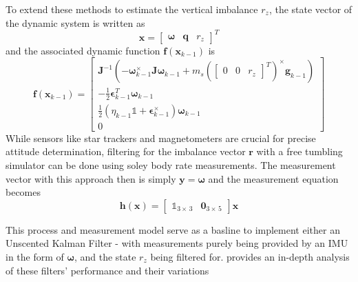 To extend these methods to estimate the vertical imbalance $r_z$, the state vector of the dynamic system is written as 
\begin{equation}
    \bm{x} = \begin{bmatrix} \bm{\omega} & \bm{q} & r_z \end{bmatrix}^T
\end{equation}
and the associated dynamic function $\bm{f}(\bm{x}_{k-1})$ is
\begin{equation}
    \bm{f}(\bm{x}_{k-1}) = \begin{bmatrix}
        \bm{J}^{-1}(-\bm{\omega}_{k-1}^\times \bm{J\omega}_{k-1} + m_s
        (\begin{bmatrix}
            0 & 0 & r_z
        \end{bmatrix}^T)^{\times}\bm{g}_{k-1})
        \\
        -\frac{1}{2}\bm{\epsilon}_{k-1}^T\bm{\omega}_{k-1} 
        \\
        \frac{1}{2}(\eta_{k-1}\mathbb{1} + \bm{\epsilon}_{k-1}^{\times})\bm{\omega}_{k-1}
        \\
        0
    \end{bmatrix}
\end{equation}
 While sensors like star trackers and magnetometers are crucial for precise attitude determination, filtering for the imbalance vector $\bm{r}$ with a free tumbling simulator can be done using soley body rate measurements. The measurement vector with this approach then is simply $\bm{y}=\bm{\omega}$ and the measurement equation becomes
\begin{equation}
    \bm{h}(\bm{x})= \begin{bmatrix}
        \mathbb{1}_{3\times\,3} & \bm{0}_{3\times\,5}
    \end{bmatrix}\bm{x}
\end{equation}

This process and measurement model serve as a basline to implement either an Unscented Kalman Filter - with measurements purely being provided by an IMU in the form of $\bm{\omega}$, and the state $r_z$ being filtered for. \cite{silva_filtering_2018} provides an in-depth analysis of these filters' performance and their variations

